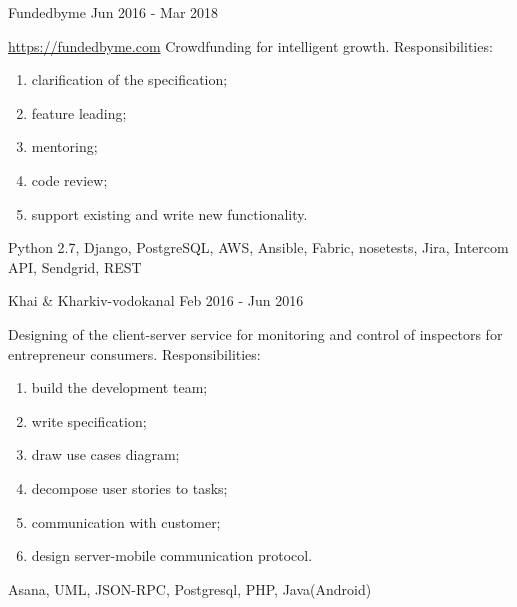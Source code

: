 \documentclass[11pt,a4paper]{moderncv}
\begin{document}
	\cvline
	{Fundedbyme Jun 2016 - Mar 2018}
	{\url{https://fundedbyme.com}\newline{}
		Crowdfunding for intelligent growth.\newline{}
        Responsibilities:
            \begin{enumerate}
                \item clarification of the specification;
                \item feature leading;
                \item mentoring;
                \item code review;
                \item support existing and write new functionality.
            \end{enumerate}
		\newline{}\newline{}
		Python 2.7, Django, PostgreSQL, AWS, Ansible, Fabric, nosetests, Jira, Intercom API, Sendgrid, REST}

	\cvline
	{Khai \& Kharkiv-vodokanal  Feb 2016 - Jun 2016}
    {Designing of the client-server service for monitoring and control of inspectors for entrepreneur consumers.\newline{}
    Responsibilities:
        \begin{enumerate}
            \item build the development team;
            \item write specification;
            \item draw use cases diagram;
            \item decompose user stories to tasks;
            \item communication with customer;
            \item design server-mobile communication protocol.
        \end{enumerate}
    \newline{}\newline{}
    Asana, UML, JSON-RPC, Postgresql, PHP, Java(Android)}
\end{document}

